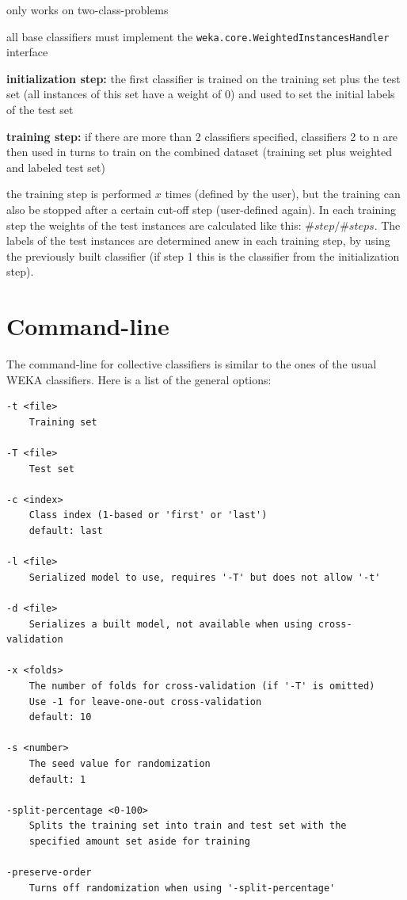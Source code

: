\documentclass[a4paper]{book}
\begin{document}
\begin{tight_itemize}
	\item only works on two-class-problems
	\item all base classifiers must implement the 
	\texttt{weka.core.WeightedInstancesHandler} interface
	\item \textbf{initialization step:} the first classifier is trained on the 
	training set plus the test set (all instances of this set have a weight of 0) 
	and used to set the initial labels of the test set
	\item \textbf{training step:} if there are more than 2 classifiers specified, 
	classifiers 2 to n are then used in turns to train on the combined dataset 
	(training set plus weighted and labeled test set)
	\item the training step is performed $x$ times (defined by the user), but 
	the training can also be stopped after a certain cut-off step (user-defined 
	again). In each training step the weights of the test instances are 
	calculated like this: $\#step/\#steps$. The labels of the test instances 
	are determined anew in each training step, by using the previously built 
	classifier (if step 1 this is the classifier from the initialization step).
\end{tight_itemize}

\chapter{Command-line}
The command-line for collective classifiers is similar to the ones of the 
usual WEKA classifiers. Here is a list of the general options:

{\scriptsize
\begin{verbatim}
-t <file>
	Training set

-T <file>
	Test set

-c <index>
	Class index (1-based or 'first' or 'last')
	default: last

-l <file>
	Serialized model to use, requires '-T' but does not allow '-t'

-d <file>
	Serializes a built model, not available when using cross-validation

-x <folds>
	The number of folds for cross-validation (if '-T' is omitted)
	Use -1 for leave-one-out cross-validation
	default: 10

-s <number>
	The seed value for randomization
	default: 1

-split-percentage <0-100>
	Splits the training set into train and test set with the
	specified amount set aside for training

-preserve-order
	Turns off randomization when using '-split-percentage'
\end{verbatim}
}
\end{document}
